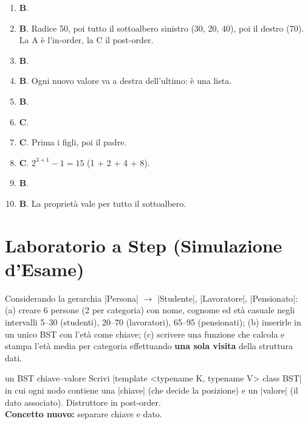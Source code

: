\begin{soluzione}
\begin{enumerate}[label=\textbf{\arabic*.}]
  \item \textbf{B}.
  \item \textbf{B}. Radice 50, poi tutto il sottoalbero sinistro (30, 20, 40), poi il destro (70).
        La A è l'in-order, la C il post-order.
  \item \textbf{B}.
  \item \textbf{B}. Ogni nuovo valore va a destra dell'ultimo: è una lista.
  \item \textbf{B}.
  \item \textbf{C}.
  \item \textbf{C}. Prima i figli, poi il padre.
  \item \textbf{C}. $2^{3+1} - 1 = 15$ (1 + 2 + 4 + 8).
  \item \textbf{B}.
  \item \textbf{B}. La proprietà vale per tutto il sottoalbero.
\end{enumerate}
\end{soluzione}

\section{Laboratorio a Step (Simulazione d'Esame)}

\begin{traccia}
Considerando la gerarchia \cc|Persona| $\to$ \cc|Studente|, \cc|Lavoratore|,
\cc|Pensionato|: (a) creare 6 persone (2 per categoria) con nome, cognome ed età casuale
negli intervalli 5--30 (studenti), 20--70 (lavoratori), 65--95 (pensionati); (b) inserirle
in un unico BST con l'età come chiave; (c) scrivere una funzione che calcola e stampa l'età
media per categoria effettuando \textbf{una sola visita} della struttura dati.
\end{traccia}

\begin{step}{un BST chiave--valore}
Scrivi \cc|template <typename K, typename V> class BST| in cui ogni nodo contiene una
\cc|chiave| (che decide la posizione) e un \cc|valore| (il dato associato). Distruttore in
post-order.\\[0.3em]
\textbf{Concetto nuovo:} separare chiave e dato.
\end{step}

